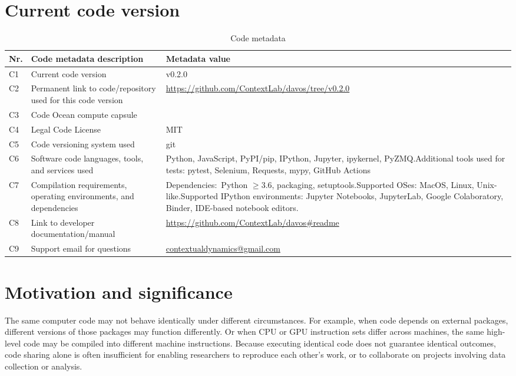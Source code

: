 \documentclass[preprint,12pt,a4paper]{elsarticle}
\begin{document}
\section*{Current code version}

\begin{table}[H]
\begin{tabular}{|l|p{6.5cm}|p{6.5cm}|}
\hline
\textbf{Nr.} & \textbf{Code metadata description} & \textbf{Metadata value} \\
\hline
C1 & Current code version &  v0.2.0 \\
\hline
C2 & Permanent link to code/repository used for this code version & \url{https://github.com/ContextLab/davos/tree/v0.2.0} \\
\hline
C3 & Code Ocean compute capsule & \\
\hline
C4 & Legal Code License & MIT \\
\hline
C5 & Code versioning system used & git \\
\hline
C6 & Software code languages, tools, and services used & Python, JavaScript, PyPI/pip, IPython, Jupyter, ipykernel, PyZMQ.\newline Additional tools used for tests: pytest, Selenium, Requests, mypy, GitHub Actions \\
\hline
C7 & Compilation requirements, operating environments, and
     dependencies & Dependencies:~Python $\geq 3.6$, packaging, setuptools.\newline Supported OSes: MacOS, Linux, Unix-like.\newline Supported IPython environments: Jupyter Notebooks, JupyterLab, Google Colaboratory, Binder, IDE-based notebook editors. \\
\hline
C8 & Link to developer documentation/manual & \url{https://github.com/ContextLab/davos\#readme} \\
\hline
C9 & Support email for questions & \href{mailto:contextualdynamics@gmail.com}{contextualdynamics@gmail.com} \\
\hline
\end{tabular}
\caption{Code metadata}
\label{}
\end{table}

\linenumbers


\section{Motivation and significance}

The same computer code may not behave identically under different
circumstances.  For example, when code depends on external packages,
different versions of those packages may function differently.  Or
when CPU or GPU instruction sets differ across machines, the same
high-level code may be compiled into different machine instructions.
Because executing identical code does not guarantee identical
outcomes, code sharing alone is often insufficient for enabling
researchers to reproduce each other's work, or to collaborate on
projects involving data collection or analysis.
\end{document}
